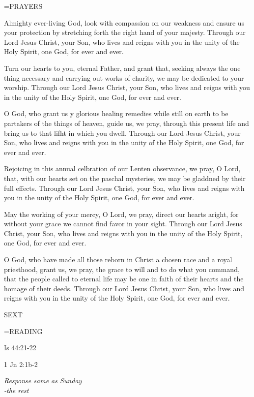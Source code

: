 \hangindent=\parindent \small PRAYERS
\begin{description}[labelindent=\parindent, leftmargin=*]
\item [Saturday after Ash Wednesday:] 	Almighty ever-living God, look with compassion on our weakness and ensure us your protection by stretching forth the right hand of your majesty. Through our Lord Jesus Christ, your Son, who lives and reigns with you in the unity of the Holy Spirit, one God, for ever and ever.
\item [Week 1:] 	Turn our hearts to you, eternal Father, and grant that, seeking always the one thing necessary and carrying out works of charity, we may be dedicated to your worship. Through our Lord Jesus Christ, your Son, who lives and reigns with you in the unity of the Holy Spirit, one God, for ever and ever.
\item [Week 2:] 	O God, who grant us y glorious healing remedies while still on earth to be partakers of the things of heaven, guide us, we pray, through this present life and bring us to that lifht in which you dwell. Through our Lord Jesus Christ, your Son, who lives and reigns with you in the unity of the Holy Spirit, one God, for ever and ever.
\item [Week 3:] 	Rejoicing in this annual celbration of our Lenten observance, we pray, O Lord, that, with our hearts set on the paschal mysteries, we may be gladdned by their full effects. Through our Lord Jesus Christ, your Son, who lives and reigns with you in the unity of the Holy Spirit, one God, for ever and ever.
\item [Week 4:] 	May the working of your mercy, O Lord, we pray, direct our hearts aright, for without your grace we cannot find favor in your sight. Through our Lord Jesus Christ, your Son, who lives and reigns with you in the unity of the Holy Spirit, one God, for ever and ever.
\item [Week 5:] 	O God, who have made all those reborn in Christ a chosen race and a royal priesthood, grant us, we pray, the grace to will and to do what you command, that the people called to eternal life may be one in faith of their hearts and the homage of their deeds. Through our Lord Jesus Christ, your Son, who lives and reigns with you in the unity of the Holy Spirit, one God, for ever and ever.
\end{description}

\begin{flushleft}\normalsize SEXT\\\end{flushleft}

\hangindent=\parindent \small READING
\begin{description}[labelindent=\parindent, leftmargin=*]
\item [Saturday after Ash Wednesday \& Weeks 1-4:]     Is 44:21-22 \textbf{    \\}
\item [Week 5:]     1 Jn 2:1b-2 \textbf{    \\}
\end{description}

\begin{center}
\textit{Response same as Sunday\\
-the rest}
\end{center}
